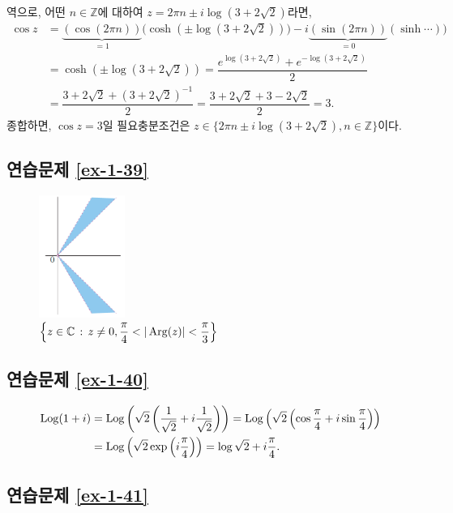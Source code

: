 역으로, 어떤 $n\in\mathbb Z$에 대하여 $z=2\pi n \pm i \log(3+2\sqrt{2})$라면,
\begin{align*}
\cos z &= \underbrace{(\cos(2\pi n))}_{=1} \Big(\cosh (\pm \log(3+2\sqrt{2}))\Big)
- i \underbrace{(\sin(2\pi n))}_{=0}(\sinh \cdots)) \\
&= \cosh(\pm \log(3+ 2\sqrt{2})) = \dfrac{e^{\log(3+2\sqrt{2})}+ e^{-\log(3+2\sqrt{2})}}2 \\
&= \dfrac{3+2\sqrt{2} + (3+2\sqrt{2})^{-1}}2 =
\dfrac{3+2\sqrt{2} + 3-2\sqrt{2}}2 = 3.
\end{align*}
종합하면, $\cos z =3$일 필요충분조건은
$z \in \{ 2\pi n \pm i \log(3+2\sqrt{2}), n\in\mathbb Z\}$이다.

\subsection*{연습문제 \ref{ex-1-39}}

\begin{figure}[h!]
\begin{center}
\includegraphics[width=0.25\textwidth]{./Solution/figs/fig-5-14}
\end{center}
\caption{$\left\{ z \in\mathbb C \,:\, z\ne0, \displaystyle\frac\pi4 < |\mathop{\mathrm{Arg}}(z)| < \displaystyle\frac\pi3 \right\}$
}
\label{fig-5-14}
\end{figure}

\subsection*{연습문제 \ref{ex-1-40}}

\begin{align*}
\mathop{\mathrm{Log}}(1+i) &= \mathop{\mathrm{Log}}\left( \sqrt{2} \left( \displaystyle\frac1{\sqrt{2}} + i \displaystyle\frac1{\sqrt{2}} \right)\right)
= \mathop{\mathrm{Log}}\left( \sqrt{2} \left( \cos\displaystyle\frac\pi4 + i \sin\displaystyle\frac\pi4 \right)\right) \\
&= \mathop{\mathrm{Log}}\left(\sqrt{2}\exp\left(i \displaystyle\frac\pi4\right)\right) = \log\sqrt{2} + i \displaystyle\frac\pi4.
\end{align*}

\subsection*{연습문제 \ref{ex-1-41}}

